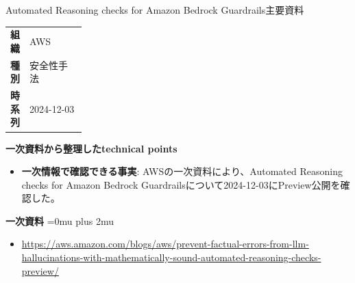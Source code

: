 \begin{technicalnote}{Automated Reasoning checks for Amazon Bedrock Guardrails}{主要資料}
\begingroup
\begin{tabularx}{\linewidth}{@{}>{\bfseries}p{0.22\linewidth}X@{}}
組織 & AWS \\
種別 & 安全性手法 \\
時系列 & 2024-12-03 \\
\end{tabularx}
\smallskip
{\bfseries 一次資料から整理したtechnical points}
\begin{itemize}[leftmargin=1.5em,itemsep=0.35em]
\item \textbf{一次情報で確認できる事実}: AWSの一次資料により、Automated Reasoning checks for Amazon Bedrock Guardrailsについて2024-12-03にPreview公開を確認した。
\end{itemize}
\begin{minipage}{\linewidth}
\begin{samepage}
{\bfseries 一次資料}
\begingroup\sloppy
\Urlmuskip=0mu plus 2mu\relax
\begin{itemize}[leftmargin=1.5em,itemsep=0.25em]
\item {\scriptsize\url{https://aws.amazon.com/blogs/aws/prevent-factual-errors-from-llm-hallucinations-with-mathematically-sound-automated-reasoning-checks-preview/}}
\end{itemize}
\endgroup
\end{samepage}
\end{minipage}
\endgroup
\end{technicalnote}
\medskip

